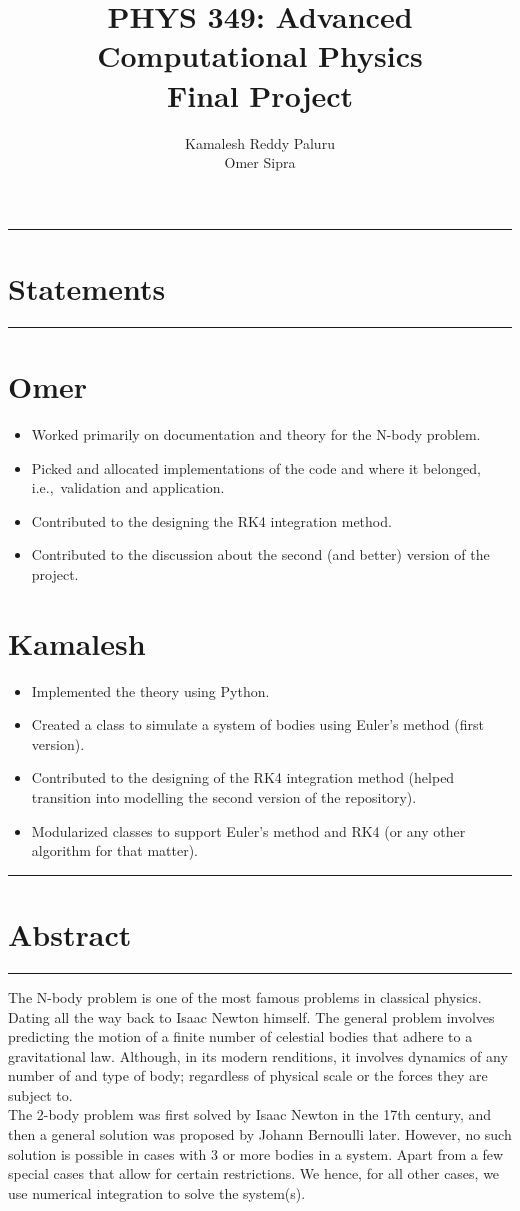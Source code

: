 \documentclass[11pt]{article}
\title{
    PHYS 349: Advanced Computational Physics\\
    \vspace{10pt}
    \textbf{Final Project}\\
}
\author{
    Kamalesh Reddy Paluru\\
    Omer Sipra
}
\newcommand{\psection}[1]{{
    \begin{center}
        \noindent \rule{17cm}{0.4pt}
        \section*{\LARGE #1}
        \noindent \rule{17cm}{0.4pt}
    \end{center}
}}
\newcommand{\psubsection}[1]{{\section*{\LARGE #1}}}
\begin{document}
    \maketitle

    \psection{Statements}

    \psubsection{Omer}
    \begin{itemize}
        \item Worked primarily on documentation and theory for the N-body problem.
        \item Picked and allocated implementations of the code and where it belonged, i.e.,\ validation and application.
        \item Contributed to the designing the RK4 integration method.
        \item Contributed to the discussion about the second (and better) version of the project.
    \end{itemize}

    \psubsection{Kamalesh}
    \begin{itemize}
        \item Implemented the theory using Python.
        \item Created a class to simulate a system of bodies using Euler's method (first version).
        \item Contributed to the designing of the RK4 integration method (helped transition into modelling the second version of the repository).
        \item Modularized classes to support Euler's method and RK4 (or any other algorithm for that matter).
    \end{itemize}

    \newpage
    
    \psection{Abstract}
    The N-body problem is one of the most famous problems in classical physics. Dating all the way back to Isaac Newton himself. The general problem involves predicting the motion of a finite number of celestial bodies that adhere to a gravitational law. Although, in its modern renditions, it involves dynamics of any number of and type of body; regardless of physical scale or the forces they are subject to.\\

    The 2-body problem was first solved by Isaac Newton in the 17th century, and then a general solution was proposed by Johann Bernoulli later. However, no such solution is possible in cases with 3 or more bodies in a system. Apart from a few special cases that allow for certain restrictions. We hence, for all other cases, we use numerical integration to solve the system(s).\\
\end{document}
